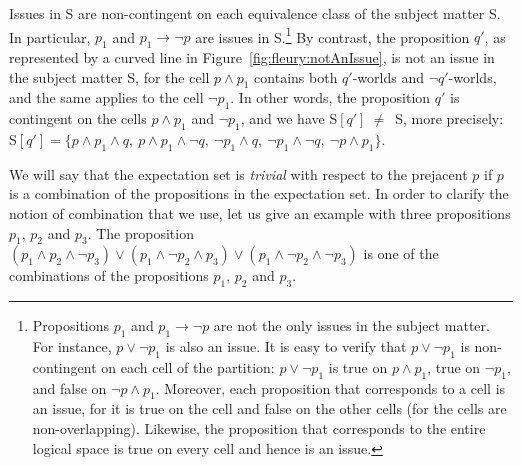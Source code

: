 \documentclass[output=paper,colorlinks,citecolor=brown,
]{langscibook}
\begin{document}
Issues in S are non-contingent on each equivalence class of the subject matter S. In particular, $p_1$ and  $p_1 \rightarrow \neg p$ are issues in S.\footnote{Propositions $p_1$ and $p_1\rightarrow \neg{}p$ are not the only issues in the subject matter. For instance, $p \lor \neg p_1$ is also an issue. It is easy to verify that $p \lor \neg p_1$ is non-contingent on each cell of the partition: $p \lor \neg p_1$ is true on $p \land p_1$, true on $\neg p_1$, and false on $\neg p \land p_1$.
{Moreover, each proposition that corresponds to a cell is an issue, for it is true on the cell and false on the other cells (for the cells are non-overlapping). Likewise, the proposition that corresponds to the entire logical space is true on every cell and hence is an issue.}
}
By contrast, the proposition $q'$, as represented by a curved line in Figure~\ref{fig:fleury:notAnIssue}, is not an issue in the subject matter S, for the cell $p \land p_1$ contains both $q'$-worlds and $\neg q'$-worlds, 
and the same applies to the cell $\neg p_1$. In other words, the proposition $q'$ is contingent on the cells $p \land p_1$ and $\neg p_1$, and we have S$[q']~\neq$~S, more precisely: S$[q']=\{p \land p_1 \land q, \ p \land p_1 \land \neg q, \ \neg p_1 \land q, \ \neg p_1 \land \neg q, \ \neg p \land p_1\}$.

We will say that the expectation set is \textit{trivial} with respect to the prejacent $p$ if $p$ is a combination
of the propositions in the expectation set. In order to clarify the notion of combination that we use, let us give an example with three propositions $p_1$, $p_2$ and $p_3$. The proposition $(p_1 \land p_2 \land \neg p_3) \lor (p_1 \land \neg p_2 \land p_3) \lor (p_1 \land \neg p_2 \land \neg p_3)$ is one of the combinations of the propositions $p_1$, $p_2$ and $p_3$.
\end{document}
